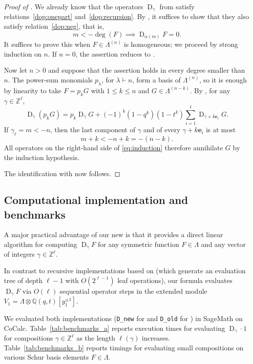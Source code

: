 \documentclass[reqno]{amsart}
\theoremstyle{plain}
\theoremstyle{definition}
\theoremstyle{remark}
\DeclareMathOperator{\D}{D}
\newcommand{\Z}{\mathbb{Z}}
\newcommand{\<}{\langle}
\renewcommand{\>}{\rangle}
\begin{document}
\begin{proof}[Proof of ]
    We already know that the operators $\D_\gamma$ from \cite{BHMPS2023ShuffleAnyLine} satisfy relations~\eqref{dop:onepart} and~\eqref{dop:recursion}. By , it suffices to show that they also satisfy relation~\eqref{dop:neg}, that is, 
    \[ m < -\deg(F) \implies \D_{\alpha (m)} F = 0. \]
    It suffices to prove this when $F \in \Lambda^{(n)}$ is homogeneous; we proceed by strong induction on $n$. If $n=0$, the assertion reduces to .

    Now let $n>0$ and suppose that the assertion holds in every degree smaller than $n$. The power-sum monomials $p_\lambda$, for $\lambda\vdash n$, form a basis of $\Lambda^{(n)}$, so it is enough by linearity to take $F=p_kG$ with $1\leq k\leq n$ and $G\in\Lambda^{(n-k)}$. By , for any $\gamma\in\Z^\ell$,
    \begin{equation}
        \label{eq:induction}
        \D_{\gamma}(p_kG) = p_k \D_{\gamma} G + (-1)^k (1-q^k)(1-t^k) \sum_{i=1}^{\ell}\D_{\gamma + k \mathbf{e}_i} G.
    \end{equation}
    If $\gamma_\ell=m<-n$, then the last component of $\gamma$ and of every $\gamma+k\mathbf e_i$ is at most
    \[ m+k<-n+k=-(n-k). \]
    All operators on the right-hand side of \eqref{eq:induction} therefore annihilate $G$ by the induction hypothesis.

    The identification with  now follows.
\end{proof}


\subsection{Computational implementation and benchmarks}
\label{sec:benchmarks}

A major practical advantage of our new  is that it provides a direct linear algorithm for computing $\D_\gamma F$ for any symmetric function $F \in \Lambda$ and any vector of integers $\gamma \in \mathbb{Z}^\ell$.

In contrast to recursive implementations based on  (which generate an evaluation tree of depth $\ell-1$ with $O(2^{\ell-1})$ leaf operations), our formula evaluates $\D_\gamma F$ via $O(\ell)$ sequential operator steps in the extended module $V_1 = \Lambda \otimes \mathbb{Q}(q,t)[y_1^{\pm 1}]$.

We evaluated both implementations (\texttt{D\_new} for  and \texttt{D\_old} for ) in SageMath on CoCalc. Table~\ref{tab:benchmarks_a} reports execution times for evaluating $\D_\gamma \cdot 1$ for compositions $\gamma \in \mathbb{Z}^\ell$ as the length $\ell(\gamma)$ increases. Table~\ref{tab:benchmarks_b} reports timings for evaluating small compositions on various Schur basis elements $F \in \Lambda$.
\end{document}
